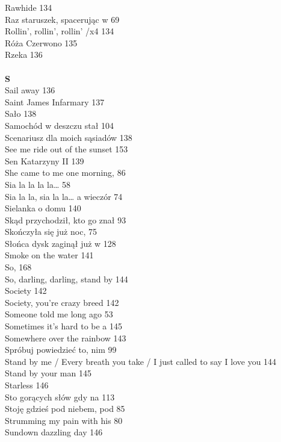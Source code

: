 \documentclass[a5paper, 10pt]{book}
\begin{document}
{\begin{multicols}{3}
    Rawhide 134\\
    Raz staruszek, spacerując w 69\\
    Rollin', rollin', rollin' /x4 134\\
    Róża Czerwono 135\\
    Rzeka 136\\
    \\
    {\footnotesize \textbf{S\\} }
    Sail away 136\\
    Saint James Infarmary 137\\
    Sało 138\\
    Samochód w deszczu stał 104\\
    Scenariusz dla moich sąsiadów 138\\
    See me ride out of the sunset 153\\
    Sen Katarzyny II 139\\
    She came to me one morning, 86\\
    Sia la la la la… 58\\
    Sia la la, sia la la… a wieczór 74\\
    Sielanka o domu 140\\
    Skąd przychodził, kto go znał 93\\
    Skończyła się już noc, 75\\
    Słońca dysk zaginął już w 128\\
    Smoke on the water 141\\
    So, 168\\
    So, darling, darling, stand by 144\\
    Society 142\\
    Society, you're crazy breed 142\\
    Someone told me long ago 53\\
    Sometimes it's hard to be a 145\\
    Somewhere over the rainbow 143\\
    Spróbuj powiedzieć to, nim 99\\
    Stand by me / Every breath you take / I just called to say I love you 144\\
    Stand by your man 145\\
    Starless 146\\
    Sto gorących słów gdy na 113\\
    Stoję gdzieś pod niebem, pod 85\\
    Strumming my pain with his 80\\
    Sundown dazzling day 146\\

\end{multicols}}
\end{document}
